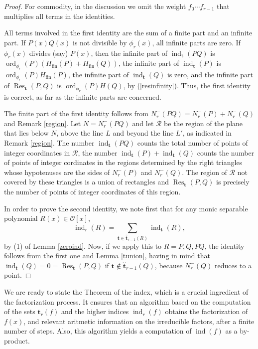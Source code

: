 \documentclass{amsart}
\def\op{\operatorname}
\def\ind{\op{ind}}
\def\oo{{\mathcal O}}
\def\ord{\op{ord}}
\def\res{\op{Res}}
\def\tt{\hat{\mathbf{t}}}
\def\ty{\mathbf{t}}
\def\zpx{\oo[x]}
\begin{document}
\begin{proof}For commodity, in the discussion we omit the weight $f_0\cdots f_{r-1}$ that multiplies all terms in the identities.

All terms involved in the first identity are the sum of a finite part and an infinite part. If $P(x)Q(x)$ is not divisible by $\phi_r(x)$, all infinite parts are zero. If $\phi_r(x)$ divides (say) $P(x)$, then the infinite part of $\ind_\ty(PQ)$ is $\ord_{\phi_r}(P)(H_{\op{fin}}(P)+H_{\op{fin}}(Q))$, the infinite part of $\ind_\ty(P)$ is 
$\ord_{\phi_r}(P)H_{\op{fin}}(P)$, the infinite part of $\ind_\ty(Q)$ is zero, and the infinite part of $\res_\ty(P,Q)$ is $\ord_{\phi_r}(P)H(Q)$, by (\ref{resinfinity}). Thus, the first identity is correct, as far as the infinite parts are concerned. 

The finite part of the first identity follows from $N_r^-(PQ)=N_r^-(P)+N_r^-(Q)$ and Remark \ref{region}. Let $N=N_r^-(PQ)$ and let $\mathcal{R}$ be the region of the plane that lies below $N$, above the line $L$ and beyond the line $L'$, as indicated in Remark \ref{region}. The number $\ind_\ty(PQ)$ counts the total number of points of integer coordinates in $\mathcal{R}$, the number
$\ind_\ty(P)+\ind_\ty(Q)$ counts the number of points of integer cordinates in the regions determined by the right triangles whose hypotenuses are the sides of $N_r^-(P)$ and $N_r^-(Q)$. The region of $\mathcal{R}$ not covered by these triangles is a union of rectangles and $\res_\ty(P,Q)$ is precisely the number of points of integer coordinates of this region.

In order to prove the second identity, we note first that for any monic separable polynomial $R(x)\in\zpx$, 
$$
\ind_r(R)=\sum_{\ty\in\tt_{r-1}(R)}\ind_\ty(R),
$$
by (1) of Lemma \ref{zeroind}. Now, if we apply this to $R=P,Q,PQ$, the identity follows from the first one and Lemma \ref{tunion}, having in mind that $\ind_\ty(Q)=0=\res_\ty(P,Q)$ if $\ty\not\in \tt_{r-1}(Q)$, because $N_r^-(Q)$ reduces to a point. 
\end{proof}

We are ready to state the Theorem of the index, which is a crucial ingredient of the factorization process. It ensures that an algorithm based on the computation of the sets $\ty_r(f)$ and the higher indices $\ind_r(f)$ obtains the factorization of $f(x)$, and relevant aritmetic information on the irreducible factors, after a finite number of steps. Also, this algorithm yields a computation of $\ind(f)$ as a by-product.
\end{document}
